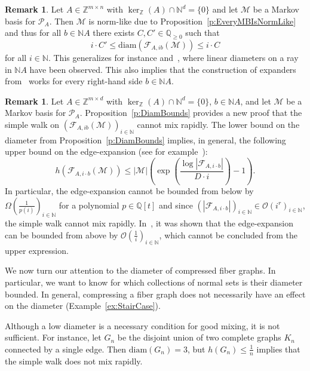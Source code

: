 \documentclass[11pt]{amsart}
\theoremstyle{definition}
\newtheorem{remark}[thm]{Remark}
\numberwithin{equation}{section}
\newcommand{\ring}[1]{\ensuremath{\mathbb{#1}}}
\renewcommand{\>}{\rangle}
\newcommand{\<}{\langle}
\newcommand{\0}{\mathbf{0}}
\newcommand{\1}{\mathbf{1}}
\newcommand{\2}{\mathbf{2}}
\newcommand\NN{\ring{N}}
\newcommand\QQ{\ring{Q}}
\newcommand\ZZ{\ring{Z}}
\newcommand\cM{{\mathcal M}}
\newcommand\cP{{\mathcal P}}
\newcommand{\fiber}[2]{\mathcal{F}_{#1,#2}}
\newcommand{\fibergraph}[3]{\mathcal{F}_{#1,#2}\left(#3\right)}
\newcommand{\diam}[1]{\mathrm{diam}(#1)}
\newcommand\cone[1]{\NN#1}
\begin{document}
\begin{remark}\label{r:RaysOfMatrices}
Let $A\in\ZZ^{m\times n}$ with $\ker_\ZZ(A)\cap\NN^d=\{0\}$ and let $\cM$ be a Markov
basis for $\cP_A$. Then $\cM$ is norm-like due to
Proposition~\ref{p:EveryMBIsNormLike} and thus for all $b\in\cone{A}$
there exists $C,C'\in\QQ_{\ge 0}$ such that 
$$i\cdot C'\le\diam{\fibergraph{A}{ib}{\cM}}\le i\cdot C$$ 
for all $i\in\NN$. This generalizes for instance
\cite[Proposition~2.10]{potka2013}
and~\cite[Example~4.7]{windisch2015-mixing}, where linear diameters
on a ray in $\cone{A}$ have been observed.
This also implies that the construction of
expanders from~\cite[Section~4]{windisch2015-mixing} works for every
right-hand side $b\in\cone{A}$.
\end{remark}

\begin{remark}\label{r:Mixing}
Let $A\in\ZZ^{m\times d}$ with $\ker_\ZZ(A)\cap\NN^d=\{0\}$,
$b\in\cone{A}$, and let $\cM$ be a Markov basis
for $\cP_A$. Proposition~\ref{p:DiamBounds} provides a new proof that
the simple walk on $(\fibergraph{A}{ib}{\cM})_{i\in\NN}$ cannot mix
rapidly. The lower bound on the diameter from Proposition~\ref{p:DiamBounds}
implies, in general, the following upper bound on the edge-expansion
(see for example~\cite[Proposition~1.30]{gardam2012}):
\begin{equation*}
h(\fibergraph{A}{i\cdot b}{\cM})\le
|\cM|\left(\exp\left(\frac{\log|\fiber{A}{i\cdot b}|}{D\cdot
i}\right)-1\right).
\end{equation*}
In particular, the edge-expansion cannot be bounded from below by
$\Omega(\frac{1}{p(i)})_{i\in\NN}$ for a polynomial $p\in\QQ[t]$ and
since  $(|\fiber{A}{i\cdot
b}|)_{i\in\NN}\in\mathcal{O}(i^r)_{i\in\NN}$, the simple walk cannot
mix rapidly. In~\cite{windisch2015-mixing}, it was shown that the
edge-expansion can be bounded from above by
$\mathcal{O}(\frac{1}{i})_{i\in\NN}$, which cannot be concluded from
the upper expression. 
\end{remark}

We now turn our attention to the diameter of compressed fiber graphs.
In particular, we want to know for which collections of normal sets is
their diameter bounded. In general, compressing a fiber
graph does not necessarily have an effect on the diameter
(Example~\ref{ex:StairCase}). 

Although a low diameter is a necessary
condition for good mixing, it is not sufficient.  For instance, let
$G_n$ be the disjoint union of two complete graphs $K_n$ connected by
a single edge. Then $\diam{G_n}=3$, but $h(G_n)\le\frac{1}{n}$ implies
that the simple walk does not mix rapidly. 
\end{document}

